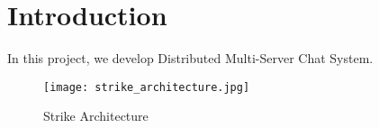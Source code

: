 \documentclass[dareport.tex]{subfiles}
\begin{document}
\section{Introduction}
In this project, we develop Distributed Multi-Server Chat System.

\begin{figure}[h]
\caption{Strike Architecture}
\label{fig:domaindecom}
\texttt{[image: strike\_architecture.jpg]}
\centering
\end{figure}
\end{document}
